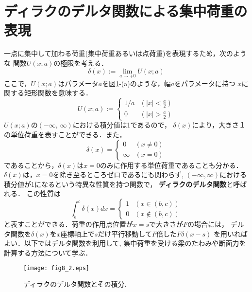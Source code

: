 \documentclass[10pt,a4j]{jbook}
\begin{document}
\section{ディラクのデルタ関数による集中荷重の表現}
一点に集中して加わる荷重(集中荷重あるいは点荷重)を表現するため，次のような
関数$U(x;a)$の極限を考える．
\begin{equation}
	\delta  (x) := \lim _ {a\rightarrow +0} U(x;a)
	\label{eqn:delta_x}
\end{equation}
ここで，$U(x;a)$はパラメータ$a$を図\ref{fig:fig8_2}-(a)のような，幅$a$をパラメータに持つ
$x$に関する矩形関数を意味する．
\begin{equation}
	U(x;a):=\left\{
		\begin{array}{cc}
			1/a & \left(\left| x \right| < \frac{a}{2} \right) \\
			0 & \left(\left| x \right| > \frac{a}{2} \right) 
		\end{array}
		\right.
	\label{eqn:def_U}
\end{equation}
$U(x;a)$の$(-\infty,\,\infty)$における積分値は1であるので，
$\delta(x)$により，大きさ１の単位荷重を表すことができる．また，
\begin{equation}
	\delta(x)=\left\{
		\begin{array}{cc}
			0 & \left(x\neq 0\right) \\
			\infty & \left(x=0 \right) 
		\end{array}
		\right.
	\label{eqn:delta_x_val}
\end{equation}
であることから，$\delta(x)$は$x=0$のみに作用する単位荷重であることも分かる．
$\delta(x)$は，$x=0$を除き至るところゼロであるにも関わらず, 
$(-\infty,\infty)$における積分値が1になるという特異な性質を持つ関数で，
{\bf ディラクのデルタ関数}と呼ばれる．
この性質は
\begin{equation}
	\int _b^c \delta(x) dx = \left\{
	\begin{array}{cc}
		1 & \left( x \in (b,c)\right) \\ 
		0 & \left( x \notin (b,c)\right)
	\end{array}
	\label{eqn:idelta_ab}
	\right.
\end{equation}
と表すことができる．荷重の作用点位置が$x=s$で大きさが$F$の場合には，
デルタ関数を$\delta(x)$を$x$座標軸上で$s$だけ平行移動して$F$倍した$F\delta (x-s)$
を用いればよい．以下ではデルタ関数を利用して, 集中荷重を受ける梁のたわみや断面力を計算する方法について学ぶ．
\begin{figure}
	\begin{center}
	\texttt{[image: fig8\_2.eps]} 
	\end{center}
	\caption{
		ディラクのデルタ関数とその積分.
	 } 
	\label{fig:fig8_2}
\end{figure}
\end{document}
